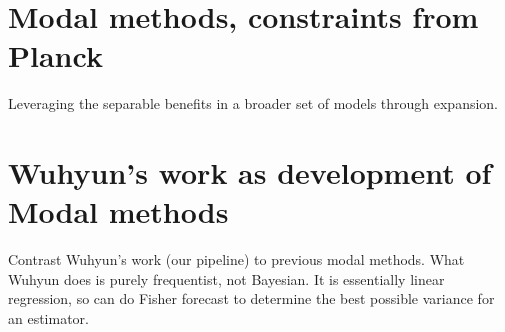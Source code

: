     \section{Modal methods, constraints from Planck}
    Leveraging the separable benefits in a broader set of models through expansion.
    \section{Wuhyun's work as development of Modal methods}
    Contrast Wuhyun's work (our pipeline) to previous modal methods.
    What Wuhyun does is purely frequentist, not Bayesian. It is essentially linear regression, so can do Fisher forecast to determine
    the best possible variance for an estimator.
    

